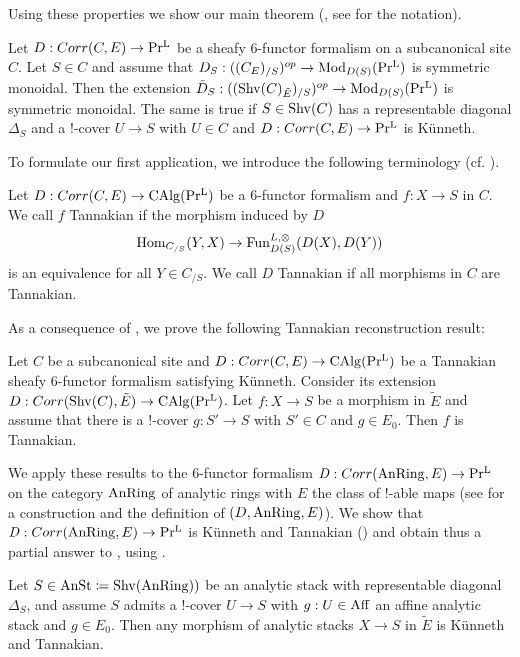 Using these properties we show our main theorem (, see  for the notation). 

 \begin{theorem}\label{intro thmA} 
    Let $D: Corr(C,E) \to \operatorname{Pr^{L}}$ be a sheafy $6$-functor formalism on a subcanonical site $C$. Let $S\in C$ and assume that $D_S: ((C_E){{_{/S}}})^{op} \to \operatorname{Mod}_{D(S)}(\operatorname{Pr^{L}})$ is symmetric monoidal. Then the extension $\tilde{D}_S: ((\operatorname{Shv}(C)_{\tilde{E}}){{_{/S}}})^{op}\to \operatorname{Mod}_{D(S)}(\operatorname{Pr^{L}}) $ is symmetric monoidal. The same is true if $S\in \operatorname{Shv}(C)$ has a representable diagonal $\Delta_S$ and a $!$-cover $U \to S$ with $U\in C$ and $D: Corr(C,E) \to \operatorname{Pr^{L}}$  is Künneth.
\end{theorem}


To formulate our first application, we introduce the following terminology (cf. ).
\begin{definition}
  Let $D: Corr(C,E)\to \operatorname{CAlg}(\operatorname{Pr^{L}})$ be a $6$-functor formalism and $f: X \to S$ in $C$. We call $f$ Tannakian if the morphism induced by $D$
  \[
 \text{Hom}_{C_{/S}}(Y,X) \to \operatorname{Fun}_{D(S)}^{L,\otimes}(D(X),D(Y))
  \]
  is an equivalence for all $Y \in C_{/S}$.  We call $D$ Tannakian if all morphisms in $C$ are Tannakian.
\end{definition}

As a consequence of , we prove the following Tannakian reconstruction result: 
\begin{theorem}
    Let $C$ be a subcanonical site and $D: Corr(C,E)\to \operatorname{CAlg}(\operatorname{Pr^{L}})$ be a Tannakian sheafy $6$-functor formalism satisfying Künneth. Consider its extension \\ $D: Corr(\operatorname{Shv}(C),\tilde{E})\to \operatorname{CAlg}(\operatorname{Pr^{L}})$. Let $f: X \to S$ be a morphism in $\tilde{E}$ and assume that there is a $!$-cover $g: S'\to S$ with $S'\in C$ and $g\in E_0$. Then $f$ is Tannakian.
\end{theorem}

We apply these results to the $6$-functor formalism  $\mathit{D}: Corr(\operatorname{AnRing}, E) \to \operatorname{Pr^{L}}$ on the category $\operatorname{AnRing}$ of analytic rings with $E$ the class of $!$-able maps (see   for a construction and the definition of $(D, \operatorname{AnRing},E)$). We show that $\mathit{D}: Corr(\operatorname{AnRing}, E) \to \operatorname{Pr^{L}}$ is Künneth and Tannakian () and obtain thus a partial answer to , using .
\begin{corollary}\label{künethgeneral for analyticstacks}
Let $S\in \operatorname{AnSt}\coloneqq \operatorname{Shv}(\operatorname{AnRing}))$ be an analytic stack with representable diagonal $\Delta_S$, and assume $S$ admits a $!$-cover $U \to S$ with $g: U \in \operatorname{Aff}$ an affine analytic stack and $g\in E_0$. Then any morphism of analytic stacks $X \to S$ in $\tilde{E}$ is Künneth and Tannakian.
\end{corollary}

